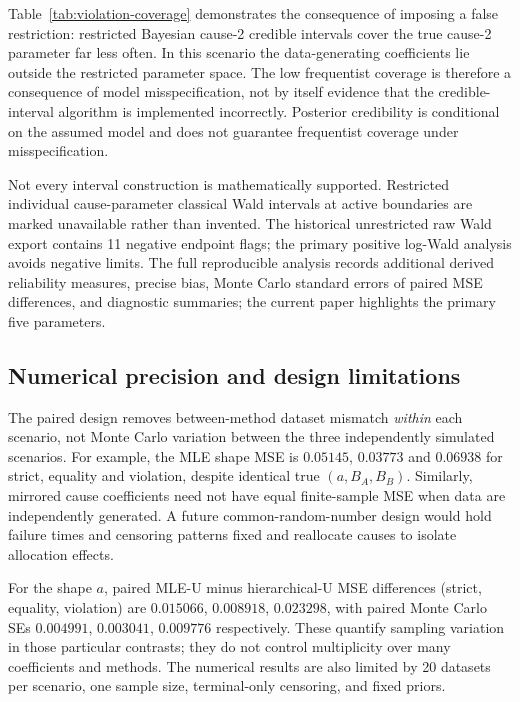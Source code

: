 \documentclass[a4paper,11pt]{article}
\begin{document}
Table~\ref{tab:violation-coverage} demonstrates the consequence of imposing a false restriction: restricted Bayesian cause-2 credible intervals cover the true cause-2 parameter far less often. In this scenario the data-generating coefficients lie outside the restricted parameter space. The low frequentist coverage is therefore a consequence of model misspecification, not by itself evidence that the credible-interval algorithm is implemented incorrectly. Posterior credibility is conditional on the assumed model and does not guarantee frequentist coverage under misspecification.

Not every interval construction is mathematically supported. Restricted individual cause-parameter
classical Wald intervals at active boundaries are marked unavailable rather than invented.
The historical unrestricted raw Wald export contains 11 negative endpoint flags; the primary
positive log-Wald analysis avoids negative limits. The full reproducible analysis records
additional derived reliability measures, precise bias, Monte Carlo standard errors of paired
MSE differences, and diagnostic summaries; the current paper highlights the primary five parameters.

\subsection{Numerical precision and design limitations}
The paired design removes between-method dataset mismatch \emph{within} each scenario, not Monte Carlo variation between the three independently simulated scenarios. For example, the MLE shape MSE is $0.05145$, $0.03773$ and $0.06938$ for strict, equality and violation, despite identical true $(a,B_A,B_B)$. Similarly, mirrored cause coefficients need not have equal finite-sample MSE when data are independently generated. A future common-random-number design would hold failure times and censoring patterns fixed and reallocate causes to isolate allocation effects.

For the shape $a$, paired MLE-U minus hierarchical-U MSE differences (strict, equality, violation) are $0.015066$, $0.008918$, $0.023298$, with paired Monte Carlo SEs $0.004991$, $0.003041$, $0.009776$ respectively. These quantify sampling variation in those particular contrasts; they do not control multiplicity over many coefficients and methods. The numerical results are also limited by 20 datasets per scenario, one sample size, terminal-only censoring, and fixed priors.
\end{document}
